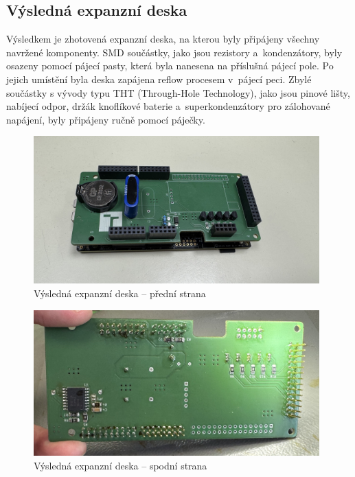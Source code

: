 \subsection{Výsledná expanzní deska}
\label{vysledek}
Výsledkem je zhotovená expanzní deska, na kterou byly připájeny všechny navržené komponenty. SMD součástky, jako jsou rezistory a~kondenzátory, byly osazeny pomocí pájecí pasty, která byla nanesena na příslušná pájecí pole. Po jejich umístění byla deska zapájena reflow procesem v~pájecí peci. Zbylé součástky s vývody typu THT (Through-Hole Technology), jako jsou pinové lišty, nabíjecí odpor, držák knoflíkové baterie a~superkondenzátory pro zálohované napájení, byly připájeny ručně pomocí páječky.

\begin{figure}[h]
    \centering
    \includegraphics[width=0.98\textwidth]{obrazky-figures/datalogger.jpg}
    
    \caption{Výsledná expanzní deska -- přední strana}
    \label{fig:expansion-board}
\end{figure}

\begin{figure}[h]
    \centering
    \includegraphics[width=0.98\textwidth]{obrazky-figures/expansion-shield-back.jpg}
    
    \caption{Výsledná expanzní deska -- spodní strana}
    \label{fig:expansion-board-back}
\end{figure}


